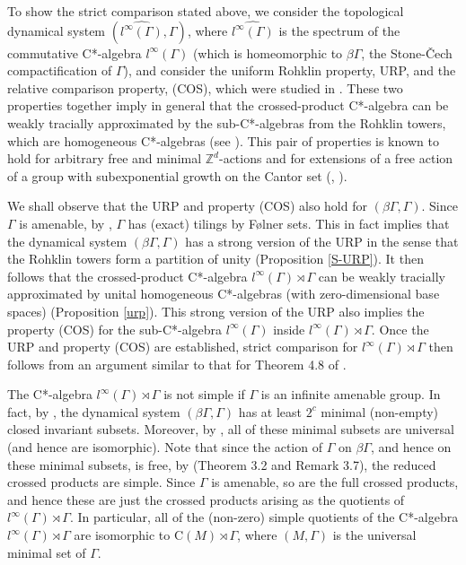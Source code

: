 \documentclass[12pt, oneside, psamsfonts]{amsart}
\theoremstyle{definition}
\theoremstyle{remark}
\numberwithin{equation}{section}
\newcommand{\Int}{\mathbb Z}
\begin{document}
To show the strict comparison stated above, we consider the topological dynamical system $(\widehat{l^\infty(\Gamma)},  \Gamma)$, where $\widehat{l^\infty(\Gamma)}$ is the spectrum of the commutative C*-algebra $l^\infty(\Gamma)$ (which is homeomorphic to $\beta\Gamma$, the Stone-\v{C}ech compactification of $\Gamma$), and consider the uniform Rohklin property, URP,  and the relative comparison property, (COS), which were studied in \cite{Niu-MD-Z}. These two properties together imply in general that the crossed-product C*-algebra can be weakly tracially approximated by the sub-C*-algebras from the Rohklin towers, which are homogeneous C*-algebras (see \cite{Niu-MD-Z}). This pair of  properties is known to hold for arbitrary free and minimal $\Int^d$-actions and for extensions of a free action of a group with subexponential growth on the Cantor set (\cite{Niu-MD-Zd}, \cite{Niu-MD-Z}). %


We shall observe that the URP and property (COS) also hold for $(\beta\Gamma,  \Gamma)$. Since $\Gamma$ is amenable, by \cite{DHZ-tiling}, $\Gamma$ has (exact) tilings by F{\o}lner sets. This in fact implies that the dynamical system $(\beta\Gamma, \Gamma)$ has a strong version of the URP in the sense that the Rohklin towers form a partition of unity (Proposition \ref{S-URP}). It then follows that the crossed-product C*-algebra $l^\infty(\Gamma) \rtimes \Gamma$ can be weakly tracially approximated by unital homogeneous C*-algebras (with zero-dimensional base spaces) (Proposition \ref{urp}). This strong version of the URP also implies the property (COS) for the sub-C*-algebra $l^\infty(\Gamma)$ inside $l^\infty(\Gamma) \rtimes \Gamma$. Once the URP and property (COS) are established, strict comparison  for $l^\infty(\Gamma) \rtimes \Gamma$ then follows from an argument similar to that for Theorem 4.8 of \cite{Niu-MD-Z}.

The C*-algebra $l^\infty(\Gamma) \rtimes \Gamma$ is not simple if $\Gamma$ is an infinite amenable group. In fact, by \cite{Chou_1969}, the dynamical system $(\beta\Gamma, \Gamma)$ has at least $2^c$ minimal (non-empty) closed invariant subsets. Moreover, by \cite{Ellis_1960}, all of these minimal subsets are  universal (and hence are isomorphic). Note that since the action of $\Gamma$ on $\beta\Gamma$, and hence on these minimal subsets, is free, by \cite{Elliott_1980} (Theorem 3.2 and Remark 3.7), the reduced crossed products are simple. Since $\Gamma$ is amenable, so are the full crossed products, and hence these are just the crossed products arising as the quotients of $l^\infty(\Gamma) \rtimes \Gamma$. In particular, all of the (non-zero) simple quotients of the C*-algebra $l^\infty(\Gamma) \rtimes \Gamma$ are isomorphic to $\mathrm{C}(M) \rtimes \Gamma$, where $(M, \Gamma)$ is the universal minimal set of $\Gamma$. 
\end{document}
